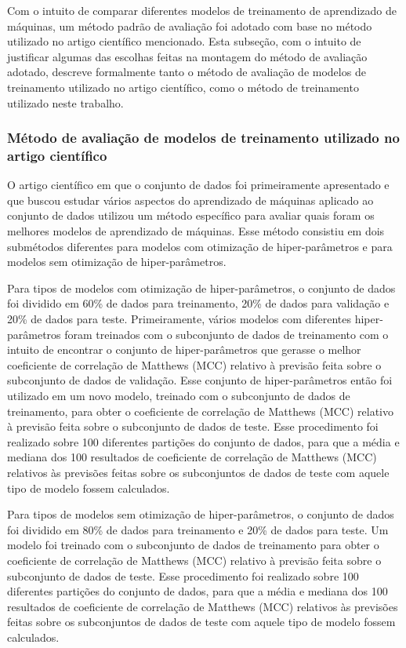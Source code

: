 Com o intuito de comparar diferentes modelos de treinamento de aprendizado de máquinas, um método padrão de avaliação foi adotado com base no método utilizado no artigo científico\cite{chicco2020} mencionado. Esta subseção, com o intuito de justificar algumas das escolhas feitas na montagem do método de avaliação adotado, descreve formalmente tanto o método de avaliação de modelos de treinamento utilizado no artigo científico, como o método de treinamento utilizado neste trabalho.

\subsubsection{Método de avaliação de modelos de treinamento utilizado no artigo científico}

O artigo científico\cite{chicco2020} em que o conjunto de dados\cite{larxel_dataset} foi primeiramente apresentado e que buscou estudar vários aspectos do aprendizado de máquinas aplicado ao conjunto de dados utilizou um método específico para avaliar quais foram os melhores modelos de aprendizado de máquinas. Esse método consistiu em dois submétodos diferentes para modelos com otimização de hiper-parâmetros e para modelos sem otimização de hiper-parâmetros.

Para tipos de modelos com otimização de hiper-parâmetros, o conjunto de dados foi dividido em 60\% de dados para treinamento, 20\% de dados para validação e 20\% de dados para teste. Primeiramente, vários modelos com diferentes hiper-parâmetros foram treinados com o subconjunto de dados de treinamento com o intuito de encontrar o conjunto de hiper-parâmetros que gerasse o melhor coeficiente de correlação de Matthews (MCC) relativo à previsão feita sobre o subconjunto de dados de validação. Esse conjunto de hiper-parâmetros então foi utilizado em um novo modelo, treinado com o subconjunto de dados de treinamento, para obter o coeficiente de correlação de Matthews (MCC) relativo à previsão feita sobre o subconjunto de dados de teste. Esse procedimento foi realizado sobre 100 diferentes partições do conjunto de dados, para que a média e mediana dos 100 resultados de coeficiente de correlação de Matthews (MCC) relativos às previsões feitas sobre os subconjuntos de dados de teste com aquele tipo de modelo fossem calculados.

Para tipos de modelos sem otimização de hiper-parâmetros, o conjunto de dados foi dividido em 80\% de dados para treinamento e 20\% de dados para teste. Um modelo foi treinado com o subconjunto de dados de treinamento para obter o coeficiente de correlação de Matthews (MCC) relativo à previsão feita sobre o subconjunto de dados de teste. Esse procedimento foi realizado sobre 100 diferentes partições do conjunto de dados, para que a média e mediana dos 100 resultados de coeficiente de correlação de Matthews (MCC) relativos às previsões feitas sobre os subconjuntos de dados de teste com aquele tipo de modelo fossem calculados.

